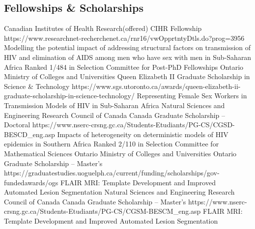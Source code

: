 \subsection{Fellowships \& Scholarships}
  {Canadian Institutes of Health Research}{(offered)}
  {CIHR Fellowship}
  {https://www.researchnet-recherchenet.ca/rnr16/vwOpprtntyDtls.do?prog=3956}
  {Modelling the potential impact of addressing structural factors on transmission of HIV and elimination of AIDS among men who have sex with men in Sub-Saharan Africa}
  {Ranked 1/484 in Selection Committee for Post-PhD Fellowships}
  {Ontario Ministry of Colleges and Universities}{}
  {Queen Elizabeth II Graduate Scholarship in Science \& Technology}
  {https://www.sgs.utoronto.ca/awards/queen-elizabeth-ii-graduate-scholarship-in-science-technology/}
  {Representing Female Sex Workers in Transmission Models of HIV in Sub-Saharan Africa}
  {}
  {Natural Sciences and Engineering Research Council of Canada}{}
  {Canada Graduate Scholarship -- Doctoral}
  {https://www.nserc-crsng.gc.ca/Students-Etudiants/PG-CS/CGSD-BESCD_eng.asp}
  {Impacts of heterogeneity on deterministic models of HIV epidemics in Southern Africa}
  {Ranked 2/110 in Selection Committee for Mathematical Sciences}
  {Ontario Ministry of Colleges and Universities}{}
  {Ontario Graduate Scholarship -- Master's}
  {https://graduatestudies.uoguelph.ca/current/funding/scholarships/gov-fundedawards/ogs}
  {FLAIR MRI: Template Development and Improved Automated Lesion Segmentation}
  {}
  {Natural Sciences and Engineering Research Council of Canada}{}
  {Canada Graduate Scholarship -- Master's}
  {https://www.nserc-crsng.gc.ca/Students-Etudiants/PG-CS/CGSM-BESCM_eng.asp}
  {FLAIR MRI: Template Development and Improved Automated Lesion Segmentation}
  {}


